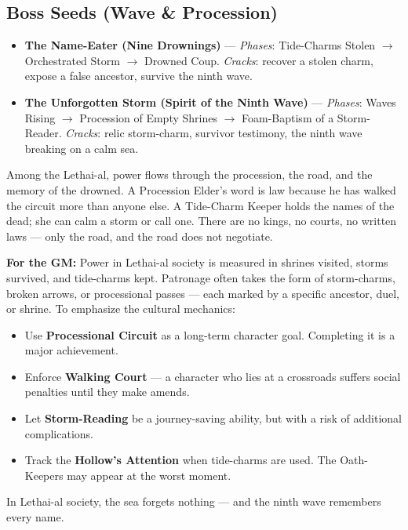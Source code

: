 \subsection*{Boss Seeds (Wave \& Procession)}
\begin{itemize}
\item \textbf{The Name-Eater (Nine Drownings)} --- \emph{Phases}: Tide-Charms Stolen $\rightarrow$ Orchestrated Storm $\rightarrow$ Drowned Coup. \emph{Cracks}: recover a stolen charm, expose a false ancestor, survive the ninth wave.
\item \textbf{The Unforgotten Storm (Spirit of the Ninth Wave)} --- \emph{Phases}: Waves Rising $\rightarrow$ Procession of Empty Shrines $\rightarrow$ Foam-Baptism of a Storm-Reader. \emph{Cracks}: relic storm-charm, survivor testimony, the ninth wave breaking on a calm sea.
\end{itemize}

\begin{tcolorbox}[colback=black!3,colframe=black!40!white,title={Patronage \& Power},breakable]
Among the Lethai-al, power flows through the procession, the road, and the memory of the drowned. A Procession Elder's word is law because he has walked the circuit more than anyone else. A Tide-Charm Keeper holds the names of the dead; she can calm a storm or call one. There are no kings, no courts, no written laws --- only the road, and the road does not negotiate.

\textbf{For the GM:}  
Power in Lethai-al society is measured in shrines visited, storms survived, and tide-charms kept. Patronage often takes the form of storm-charms, broken arrows, or processional passes --- each marked by a specific ancestor, duel, or shrine. To emphasize the cultural mechanics:
\begin{itemize}
\item Use \textbf{Processional Circuit} as a long-term character goal. Completing it is a major achievement.
\item Enforce \textbf{Walking Court} --- a character who lies at a crossroads suffers social penalties until they make amends.
\item Let \textbf{Storm-Reading} be a journey-saving ability, but with a risk of additional complications.
\item Track the \textbf{Hollow's Attention} when tide-charms are used. The Oath-Keepers may appear at the worst moment.
\end{itemize}
In Lethai-al society, the sea forgets nothing --- and the ninth wave remembers every name.
\end{tcolorbox}

